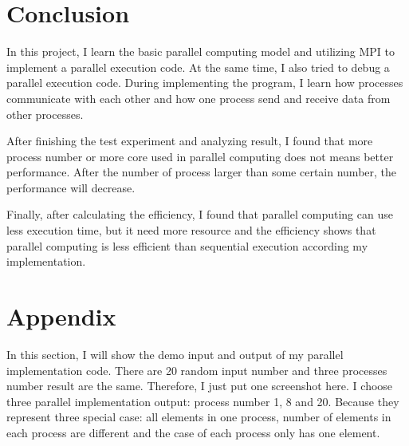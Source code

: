 \section{Conclusion}

In this project, I learn the basic parallel computing model and utilizing MPI to implement a parallel execution code. At the same time, I also tried to debug a parallel execution code. During implementing the program, I learn how processes communicate with each other and how one process send and receive data from other processes. 

After finishing the test experiment and analyzing result, I found that more process number or more core used in parallel computing does not means better performance. After the number of process larger than some certain number, the performance will decrease. 

Finally, after calculating the efficiency, I found that parallel computing can use less execution time, but it need more resource and the efficiency shows that parallel computing is less efficient than sequential execution according my implementation.

\section{Appendix}

In this section, I will show the demo input and output of my parallel implementation code. There are 20 random input number and three processes number result are the same. Therefore, I just put one screenshot here. I choose three parallel implementation output: process number 1, 8 and 20. Because they represent three special case: all elements in one process, number of elements in each process are different and the case of each process only has one element.

